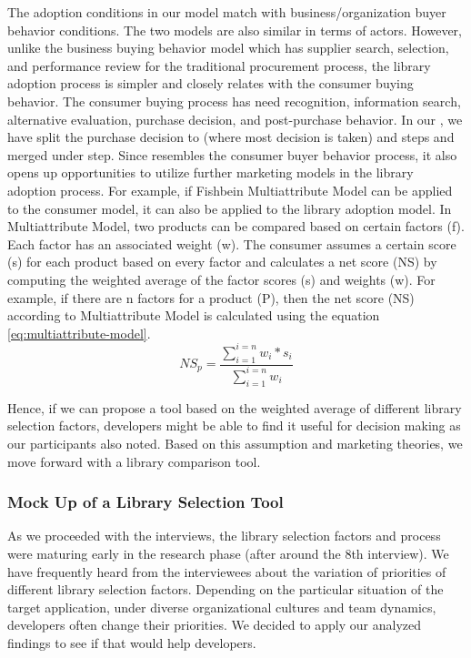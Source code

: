 The adoption conditions in our model match with business/organization buyer behavior conditions. The two models are also similar in terms of actors. However, unlike the business buying behavior model which has supplier search, selection, and performance review for the traditional procurement process, the library adoption process is simpler and closely relates with the consumer buying behavior. The consumer buying process has need recognition, information search, alternative evaluation, purchase decision, and post-purchase behavior. In our \model, we have split the purchase decision to  (where most decision is taken) and  steps and merged  under  step. Since \model\space resembles the consumer buyer behavior process, it also opens up opportunities to utilize further marketing models in the library adoption process. For example, if Fishbein Multiattribute Model \cite{fishbein1967attitude} can be applied to the consumer model, it can also be applied to the library adoption model. In Multiattribute Model, two products can be compared based on certain factors (f). Each factor has an associated weight (w). The consumer assumes a certain score (s) for each product based on every factor and calculates a net score (NS) by computing the weighted average of the factor scores (s) and weights (w). For example, if there are n factors for a product (P), then the net score (NS) according to Multiattribute Model is calculated using the equation \ref{eq:multiattribute-model}.
\begin{equation}
    NS_p = \frac{\sum_{i=1}^{i=n}w_i*s_i}{\sum_{i=1}^{i=n}w_i}
    \label{eq:multiattribute-model}
\end{equation}


Hence, if we can propose a tool based on the weighted average of different library selection factors, developers might be able to find it useful for decision making as our participants also noted. Based on this assumption and marketing theories, we move forward with a library comparison tool. 

\subsubsection{Mock Up of a Library Selection Tool}
\label{sec:mock-up}
As we proceeded with the interviews, the library selection factors and process were maturing early in the research phase (after around the 8th interview). We have frequently heard from the interviewees about the variation of priorities of different library selection factors. Depending on the particular situation of the target application, under diverse organizational cultures and team dynamics, developers often change their priorities. We decided to apply our analyzed findings to see if that would help developers.

